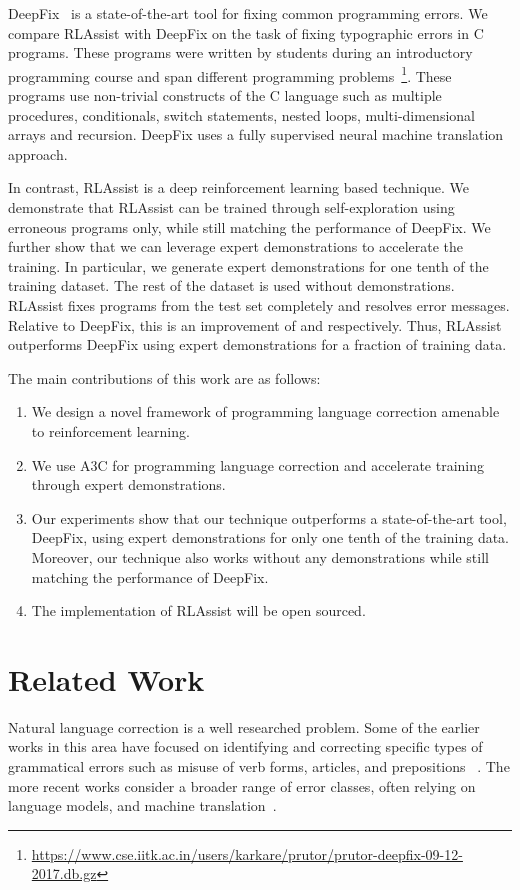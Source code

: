 \documentclass{article}
\begin{document}
DeepFix~\cite{gupta2017deepfix} is a state-of-the-art tool for fixing common
programming errors. 
We compare RLAssist with DeepFix on the task of fixing
typographic errors in  C programs. These programs were written by students
during an introductory programming course and
span  different programming problems~\cite{gupta2017deepfix,prutor}\footnote{\small{\url{https://www.cse.iitk.ac.in/users/karkare/prutor/prutor-deepfix-09-12-2017.db.gz}}}.
These programs use non-trivial constructs of 
the C language such as multiple procedures, conditionals, switch statements, nested loops,
multi-dimensional arrays and recursion.
DeepFix uses a fully supervised neural machine translation approach.

In contrast, RLAssist is a deep reinforcement learning based technique.
We demonstrate that RLAssist can be trained through self-exploration using erroneous programs only, while still matching the performance of DeepFix.
We further show that we can leverage expert demonstrations to accelerate the training.
In particular, we generate expert demonstrations for one tenth of the training dataset. The rest  of the dataset is used without demonstrations.
RLAssist fixes  programs from the test set completely and resolves  error messages.
Relative to DeepFix, this is an improvement of  and  respectively.
Thus, RLAssist outperforms DeepFix using expert demonstrations for a fraction of training data.

The main contributions of this work are as follows:
\begin{enumerate}
\item We design a novel framework of programming language correction amenable to
  reinforcement learning.
\item We use A3C for programming language correction and accelerate training 
through expert demonstrations.
\item Our experiments show that our technique outperforms a state-of-the-art tool, DeepFix, using expert demonstrations for only one tenth of the training data.
Moreover, our technique also works without any demonstrations while still matching the performance of DeepFix.
 \item The implementation of RLAssist will be open sourced.
\end{enumerate}
 \section{Related Work}
Natural language correction is a well researched problem.
Some of the earlier works in this area have focused on identifying and correcting specific types of grammatical errors such as misuse of verb forms, articles, and prepositions ~\cite{chodorow2007detection,han2006detecting,rozovskaya2010generating}.
The more recent works consider a broader range of error classes, often relying on language models, and machine translation~\cite{ng2014conll,rozovskaya2014illinois}.
\end{document}
